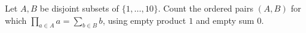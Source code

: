 Let $A,B$ be disjoint subsets of $\{1,\ldots,10\}$. Count the ordered pairs $(A,B)$ for which $\prod_{a\in A}a=\sum_{b\in B}b$, using empty product $1$ and empty sum $0$.
